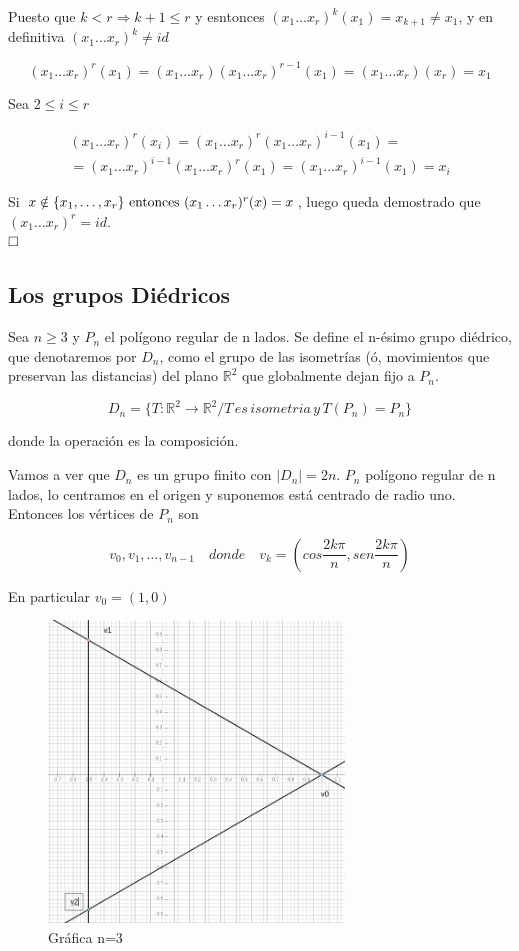 \documentclass{article}
\begin{document}
Puesto que $k<r \Rightarrow k+1\leq r$ y esntonces $(x_1\ldots x_r)^k(x_1)=x_{k+1}\neq x_1$, y en definitiva $(x_1\ldots x_r)^k\neq id$

\[
(x_1\ldots x_r)^r(x_1)=(x_1\ldots x_r)(x_1\ldots x_r)^{r-1}(x_1)=(x_1\ldots x_r)(x_r)=x_1
\]

Sea $2 \leq i \leq r$

\begin{gather*}
(x_1\ldots x_r)^r(x_i)=(x_1\ldots x_r)^r(x_1\ldots x_r)^{i-1}(x_1)= \\
=(x_1\ldots x_r)^{i-1}(x_1\ldots x_r)^r(x_1)=(x_1\ldots x_r)^{i-1}(x_1)=x_i
\end{gather*}

Si \(x \notin \{x_1,\ldots,x_r\}$ entonces \((x_1\ldots x_r)^r(x)=x\), luego queda demostrado que \((x_1\ldots x_r)^r=id\). \\

$\hfill\square$

\subsection{Los grupos Diédricos}

Sea $n\geq 3$ y $P_n$ el polígono regular de n lados. Se define el n-ésimo grupo diédrico, que denotaremos por $D_n$, como el grupo de las isometrías (ó, movimientos que preservan las distancias) del plano $\mathbb{R}^2$ que globalmente dejan fijo a $P_n$.

\[
D_n=\{T:\mathbb{R}^2\rightarrow \mathbb{R}^2/T\,es\,isometria\,y\,T(P_n)=P_n\}
\]

donde la operación es la composición.

Vamos a ver que $D_n$ es un grupo finito con $|D_n|=2n$. $P_n$ polígono regular de n lados, lo centramos en el origen y suponemos está centrado de radio uno. Entonces los vértices de $P_n$ son 

\[
v_0,v_1,\ldots,v_{n-1} \quad donde \quad v_k=\left(cos \frac{2k\pi}{n}, sen \frac{2k\pi}{n}\right)
\]

En particular $v_0=(1,0)$

\begin{figure}[h]
\centering
\caption{Gráfica n=3}
\includegraphics[scale=1,width=0.7\textwidth]{triangulo_n_3.png}
\end{figure}
\end{document}
